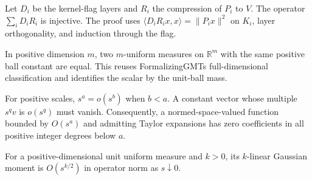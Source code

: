 \begin{lemma}
\label{lem:divided-grading-constant-injective}

Let $D_i$ be the kernel-flag layers and $R_i$ the compression of $P_i$ to $V$. The operator $\sum_i D_iR_i$ is injective. The proof uses $\langle D_iR_ix,x\rangle=\|P_ix\|^2$ on $K_i$, layer orthogonality, and induction through the flag.
\end{lemma}

\begin{lemma}
\label{lem:uniform-full-dimension-unique}

In positive dimension $m$, two $m$-uniform measures on $\mathbb R^m$ with the same positive ball constant are equal. This reuses FormalizingGMT\textquotesingle s full-dimensional classification and identifies the scalar by the unit-ball mass.
\end{lemma}

\begin{lemma}
\label{lem:asymptotic-taylor-vanishing}

For positive scales, $s^a=o(s^b)$ when $b<a$. A constant vector whose multiple $s^qv$ is $o(s^q)$ must vanish. Consequently, a normed-space-valued function bounded by $O(s^a)$ and admitting Taylor expansions has zero coefficients in all positive integer degrees below $a$.
\end{lemma}

\begin{lemma}
\label{lem:moment-operator-growth}

For a positive-dimensional unit uniform measure and $k>0$, its $k$-linear Gaussian moment is $O(s^{k/2})$ in operator norm as $s\downarrow0$.
\end{lemma}

